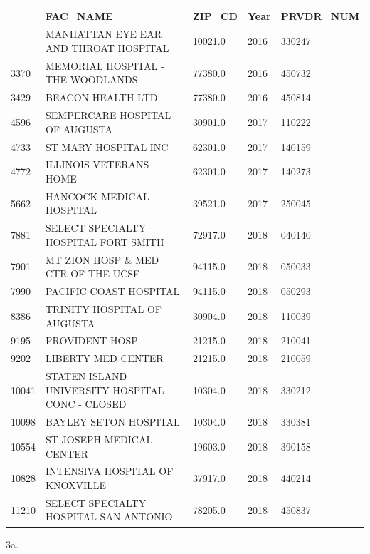 \documentclass[
  letterpaper,
  DIV=11,
  numbers=noendperiod]{scrartcl}
\begin{document}
\begin{longtable}[]{@{}lllll@{}}
\toprule\noalign{}
& FAC\_NAME & ZIP\_CD & Year & PRVDR\_NUM \\
\midrule\noalign{}
\endhead
\bottomrule\noalign{}
\endlastfoot
2320 & MANHATTAN EYE EAR AND THROAT HOSPITAL & 10021.0 & 2016 &
330247 \\
3370 & MEMORIAL HOSPITAL - THE WOODLANDS & 77380.0 & 2016 & 450732 \\
3429 & BEACON HEALTH LTD & 77380.0 & 2016 & 450814 \\
4596 & SEMPERCARE HOSPITAL OF AUGUSTA & 30901.0 & 2017 & 110222 \\
4733 & ST MARY HOSPITAL INC & 62301.0 & 2017 & 140159 \\
4772 & ILLINOIS VETERANS HOME & 62301.0 & 2017 & 140273 \\
5662 & HANCOCK MEDICAL HOSPITAL & 39521.0 & 2017 & 250045 \\
7881 & SELECT SPECIALTY HOSPITAL FORT SMITH & 72917.0 & 2018 & 040140 \\
7901 & MT ZION HOSP \& MED CTR OF THE UCSF & 94115.0 & 2018 & 050033 \\
7990 & PACIFIC COAST HOSPITAL & 94115.0 & 2018 & 050293 \\
8386 & TRINITY HOSPITAL OF AUGUSTA & 30904.0 & 2018 & 110039 \\
9195 & PROVIDENT HOSP & 21215.0 & 2018 & 210041 \\
9202 & LIBERTY MED CENTER & 21215.0 & 2018 & 210059 \\
10041 & STATEN ISLAND UNIVERSITY HOSPITAL CONC - CLOSED & 10304.0 & 2018
& 330212 \\
10098 & BAYLEY SETON HOSPITAL & 10304.0 & 2018 & 330381 \\
10554 & ST JOSEPH MEDICAL CENTER & 19603.0 & 2018 & 390158 \\
10828 & INTENSIVA HOSPITAL OF KNOXVILLE & 37917.0 & 2018 & 440214 \\
11210 & SELECT SPECIALTY HOSPITAL SAN ANTONIO & 78205.0 & 2018 &
450837 \\
\end{longtable}

3a.
\end{document}
